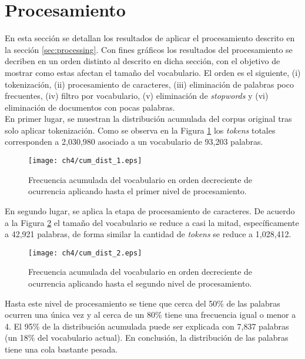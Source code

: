 \section{Procesamiento}
\label{sec:data_processing}

En esta sección se detallan los resultados de aplicar el procesamiento descrito en la sección \ref{sec:processing}. Con fines gráficos los resultados del procesamiento se decriben en un orden distinto al descrito en dicha sección, con el objetivo de mostrar como estas afectan el tamaño del vocabulario. El orden es el siguiente, (i) tokenización, (ii) procesamiento de caracteres, (iii) eliminación de palabras poco frecuentes, (iv) filtro por vocabulario, (v) eliminación de \textit{stopwords} y (vi) eliminación de documentos con pocas palabras.\\

En primer lugar, se muestran la distribución acumulada del corpus original tras solo aplicar tokenización. Como se observa en la Figura \ref{img:cum_dist1} los \textit{tokens} totales corresponden a 2,030,980 asociado a un vocabulario de 93,203 palabras.\\

\begin{figure}
    \centering
    \texttt{[image: ch4/cum\_dist\_1.eps]}
    \caption{Frecuencia acumulada del vocabulario en orden decreciente de ocurrencia aplicando hasta el primer nivel de procesamiento.}
    \label{img:cum_dist1}
\end{figure}

En segundo lugar, se aplica la etapa de procesamiento de caracteres. De acuerdo a la Figura \ref{img:cum_dist2} el tamaño del vocabulario se reduce a casi la mitad, específicamente a 42,921 palabras, de forma similar la cantidad de \textit{tokens} se reduce a 1,028,412.

\begin{figure}
    \centering
    \texttt{[image: ch4/cum\_dist\_2.eps]}
    \caption{Frecuencia acumulada del vocabulario en orden decreciente de ocurrencia aplicando hasta el segundo nivel de procesamiento.}
    \label{img:cum_dist2}
\end{figure}

Hasta este nivel de procesamiento se tiene que cerca del 50\% de las palabras ocurren una única vez y al cerca de un 80\% tiene una frecuencia igual o menor a 4. El 95\% de la distribución acumulada puede ser explicada con 7,837 palabras (un 18\% del vocabulario actual). En conclusión, la distribución de las palabras tiene una cola bastante pesada.\\

